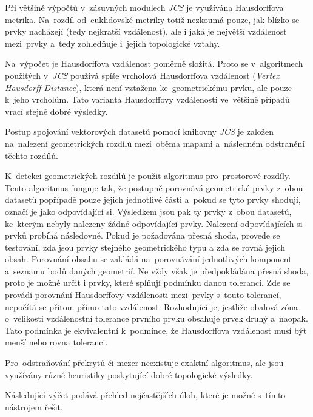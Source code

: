 Při většině výpočtů v~zásuvných modulech \textit{JCS} je využívána Hausdorffova metrika. Na~rozdíl od~euklidovské metriky totiž nezkoumá pouze, jak blízko se prvky nacházejí
(tedy nejkratší vzdálenost), ale i jaká je největší vzdálenost mezi~prvky a~tedy zohledňuje i~jejich topologické vztahy. 

Na~výpočet je Hausdorffova vzdálenost poměrně složitá. Proto se v~algoritmech použitých v~\textit{JCS} používá spíše vrcholová Hausdorffova vzdálenost (\textit{Vertex Hausdorff
 Distance}), která není vztažena ke~geometrickému prvku, ale pouze k~jeho vrcholům. Tato varianta Hausdorffovy vzdálenosti ve~většině případů vrací stejně dobré výsledky. 

Postup spojování vektorových datasetů pomocí knihovny \textit{JCS} je založen na~nalezení geometrických rozdílů mezi~oběma mapami a~následném odstranění těchto rozdílů.

K~detekci geometrických rozdílů je použit algoritmus pro~prostorové rozdíly. Tento algoritmus funguje tak, že postupně porovnává geometrické prvky z~obou datasetů popřípadě
 pouze jejich jednotlivé části a~pokud se tyto prvky shodují, označí je jako odpovídající si. Výsledkem jsou pak ty prvky z~obou datasetů, ke~kterým nebyly nalezeny žádné 
odpovídající prvky. Nalezení odpovídajících si prvků probíhá následovně. Pokud je požadována přesná shoda, provede se testování, zda jsou prvky stejného geometrického typu a
zda se rovná jejich obsah. Porovnání obsahu se zakládá na~porovnávání jednotlivých komponent a~seznamu bodů daných geometrií. Ne vždy však je předpokládána přesná shoda,
proto je možné určit i prvky, které splňují podmínku danou tolerancí. Zde se provádí porovnání Hausdorffovy vzdálenosti mezi~prvky s~touto tolerancí, nepočítá se přitom přímo
tato vzdálenost. Rozhodující je, jestliže obalová zóna o~velikosti vzdálenostní tolerance prvního prvku obsahuje prvek druhý a~naopak. Tato podmínka je ekvivalentní k~podmínce,
že Hausdorffova vzdálenost musí být menší nebo rovna toleranci. 

Pro~odstraňování překrytů či mezer neexistuje exaktní algoritmus, ale jsou využívány různé heuristiky poskytující dobré topologické výsledky.

Následující výčet podává přehled nejčastějších úloh, které je možné s~tímto nástrojem řešit.

